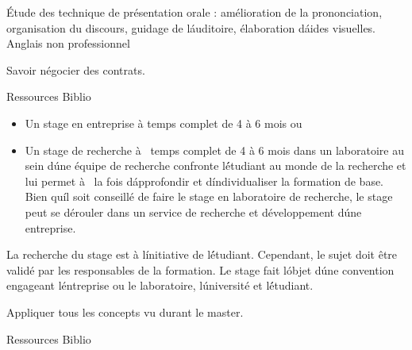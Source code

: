 \vfill

{
Étude des technique de présentation orale : amélioration de la prononciation, organisation du discours, guidage de l\'auditoire, élaboration d\'aides visuelles. 
} 
{Anglais non professionnel} 
{\begin{itemize}
\ObjItem Savoir négocier des contrats.
\end{itemize} 
} 
{Ressources} 
{Biblio} 
 
\vfill

{
\begin{itemize}
\item Un stage en entreprise à temps complet de 4 à 6 mois ou
\item Un stage de recherche  à  temps complet de 4 à 6 mois dans un laboratoire au sein d\'une équipe de
recherche confronte l\'étudiant au monde de la recherche et lui permet à  la fois d\'approfondir et d\'individualiser
la formation de base. Bien qu\'il soit conseillé de faire le stage en laboratoire de recherche, le stage peut se dérouler
dans un service de recherche et développement d\'une entreprise.
\end{itemize}
La recherche du stage est à l\'initiative de l\'étudiant.
Cependant, le sujet doit être validé par les responsables de la formation. Le stage fait l\'objet d\'une convention
engageant l\'entreprise ou le laboratoire, l\'université et l\'étudiant.  
} 
{}
{\begin{itemize}
\ObjItem Appliquer tous les concepts vu durant le master.
\end{itemize}
}
{Ressources} 
{Biblio} 
 
\vfill
